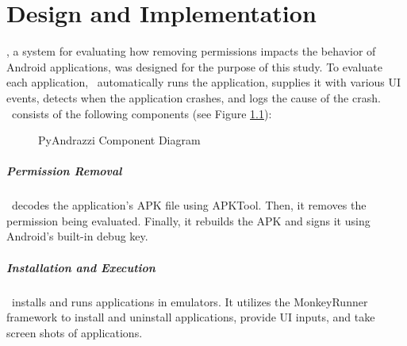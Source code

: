 \chapter{Design and Implementation}
\label{sec:method}
\toolname, a system for evaluating how removing permissions impacts the behavior of Android applications, was designed for the purpose of this study.  To evaluate each application, \toolname\ automatically runs the application, supplies it with various UI events, detects when the application crashes, and logs the cause of the crash.  
\toolname\ consists of the following components (see Figure \ref{fig:diagram}):

\begin{figure}[t]
\centerline{}
\caption{PyAndrazzi Component Diagram}
\label{fig:diagram}
\end{figure}

\paragraph{\bfseries Permission Removal}
\toolname\ decodes the application's APK file using APKTool.  Then, it removes the permission being evaluated.  Finally, it rebuilds the APK and signs it using Android's built-in debug key.

\paragraph{\bfseries Installation and Execution}
\toolname\ installs and runs applications in emulators.  It utilizes the MonkeyRunner framework to install and uninstall applications, provide UI inputs, and take screen shots of applications.

